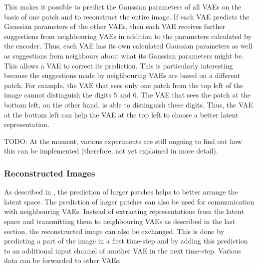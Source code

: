 This makes it possible to predict the Gaussian parameters of all VAEs on the basis of one patch and to reconstruct the entire image. If each VAE predicts the Gaussian parameters of the other VAEs, then each VAE receives further suggestions from neighbouring VAEs in addition to the parameters calculated by the encoder. Thus, each VAE has its own calculated Gaussian parameters as well as suggestions from neighbours about what its Gaussian parameters might be. This allows a VAE to correct its prediction. This is particularly interesting because the suggestions made by neighbouring VAEs are based on a different patch. For example, the VAE that sees only one patch from the top left of the image cannot distinguish the digits $5$ and $6$. The VAE that sees the patch at the bottom left, on the other hand, is able to distinguish these digits. Thus, the VAE at the bottom left can help the VAE at the top left to choose a better latent representation.

TODO: At the moment, various experiments are still ongoing to find out how this can be implemented (therefore, not yet explained in more detail).


\subsubsection{Reconstructed Images}
As described in , the prediction of larger patches helps to better arrange the latent space. The prediction of larger patches can also be used for communication with neighbouring VAEs. Instead of extracting representations from the latent space and transmitting them to neighbouring VAEs as described in the last section, the reconstructed image can also be exchanged. This is done by predicting a part of the image in a first time-step and by adding this prediction to an additional input channel of another VAE in the next time-step. Various data can be forwarded to other VAEs:%


